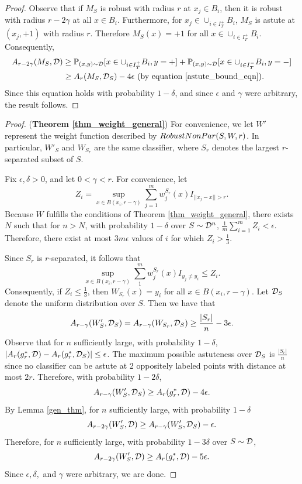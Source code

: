 \begin{proof}
Observe that if $M_S$ is robust with radius $r$ at $x_j \in B_i$, then it is robust with radius $r-2\gamma$ at all $x \in B_i$. Furthermore, for $x_j \in \cup_{i \in I_T^+}B_i$, $M_S$ is astute at $(x_j, +1)$ with radius $r$. Therefore $M_S(x) = +1$ for all $x \in \cup_{i \in I_T^+}B_i$. Consequently, 
\begin{equation*}
\begin{split}
A_{r-2\gamma}(M_S, {\mathcal D}) &\geq \mathbb{P}_{(x,y) \sim {\mathcal D}}[x \in \cup_{i \in I_T^+}B_i, y=+]+\mathbb{P}_{(x,y) \sim {\mathcal D}}[x \in \cup_{i \in I_T^-}B_i, y=-] \\
&\geq A_r(M_S, {\mathcal D}_S) - 4\epsilon \text{ }(\text{by equation }\ref{astute_bound_eqn}).
\end{split}
\end{equation*}
Since this equation holds with probability $1 - \delta$, and since $\epsilon$ and $\gamma$ were arbitrary, the result follows. 
\end{proof}

\begin{proof}(\textbf{Theorem \ref{thm_weight_general}})
For convenience, we let $W'$ represent the weight function described by $RobustNonPar(S,W, r)$. In particular, $W'_S$ and $W_{S_r}$ are the same classifier, where $S_r$ denotes the largest $r$-separated subset of $S$.

Fix $\epsilon, \delta >0$, and let $0 < \gamma < r$. For convenience, let $$Z_ i = \sup_{x \in B(x_i, r-\gamma)} \sum_{j=1}^m w_j^{S_r}(x)I_{||x_j - x|| > r}.$$ Because $W$ fulfills the conditions of Theorem \ref{thm_weight_general}, there exists $N$ such that for $n > N$, with probability $1-\delta$ over $S \sim {\mathcal D}^n$, $ \frac{1}{m} \sum_{i = 1}^m Z_i < \epsilon.$ Therefore, there exist at most $3m\epsilon$ values of $i$ for which $Z_i > \frac{1}{3}$. 

Since $S_r$ is $r$-separated, it follows that $$\sup_{x \in B(x_i, r-\gamma)} \sum_1^m w_j^{S_r}(x)I_{y_j \neq y_i} \leq Z_i.$$ Consequently, if $Z_i \leq \frac{1}{3}$, then $W_{S_r}(x) = y_i$ for all $x \in B(x_i, r-\gamma)$. Let ${\mathcal D}_S$ denote the uniform distribution over $S$. Then we have that $$A_{r-\gamma}(W'_S, {\mathcal D}_S) = A_{r-\gamma}(W_{S_r}, {\mathcal D}_S) \geq \frac{|S_r|}{n} - 3\epsilon.$$ 
Observe that for $n$ sufficiently large, with probability $1-\delta$, $|A_r(g^*_r, {\mathcal D}) - A_r(g^*_r, {\mathcal D}_S)| \leq \epsilon$. The maximum possible astuteness over ${\mathcal D}_S$ is $\frac{|S_r|}{n}$ since no classifier can be astute at 2 oppositely labeled points with distance at most $2r$. Therefore, with probability $1-2\delta$, $$A_{r - \gamma}(W'_S, {\mathcal D}_S) \geq A_r(g^*_r, {\mathcal D}) - 4\epsilon.$$ By Lemma \ref{gen_thm}, for $n$ sufficiently large, with probability $1-\delta$ $$A_{r-2\gamma}(W'_S, {\mathcal D}) \geq A_{r-\gamma}(W'_S, {\mathcal D}_S) - \epsilon.$$ Therefore, for $n$ sufficiently large, with probability $1-3\delta$ over $S \sim {\mathcal D}$, $$A_{r - 2\gamma}(W'_S, {\mathcal D}) \geq A_r(g^*_r, {\mathcal D}) - 5\epsilon.$$ Since $\epsilon, \delta,$ and $\gamma$ were arbitrary, we are done. 
\end{proof}

